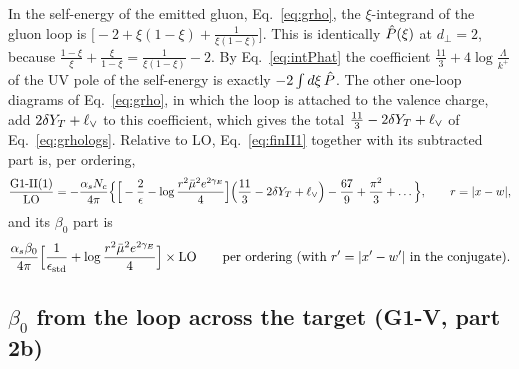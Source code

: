 In the self-energy of the emitted gluon, Eq.~\eqref{eq:grho}, the $\xi$-integrand of the gluon loop is $\big[-2+\xi(1-\xi)+\frac{1}{\xi(1-\xi)}\big]$. This is identically $\hat P(\xi)$ at $d_\perp=2$, because $\frac{1-\xi}{\xi}+\frac{\xi}{1-\xi}=\frac{1}{\xi(1-\xi)}-2$. By Eq.~\eqref{eq:intPhat} the coefficient $\frac{11}{3}+4\log\frac{\Lambda}{k^+}$ of the UV pole of the self-energy is exactly $-2\int d\xi\,\hat P$. The other one-loop diagrams of Eq.~\eqref{eq:grho}, in which the loop is attached to the valence charge, add $2\delta Y_T+\ell_{\vee}$ to this coefficient, which gives the total $\frac{11}{3}-2\delta Y_T+\ell_{\vee}$ of Eq.~\eqref{eq:grhologs}. Relative to LO, Eq.~\eqref{eq:finII1} together with its subtracted part is, per ordering,
\begin{equation}
\frac{\text{G1-II(1)}}{\rm LO}=-\frac{\alpha_sN_c}{4\pi}\Big\{\Big[-\frac2\epsilon-\log\frac{r^2\bar\mu^2e^{2\gamma_E}}{4}\Big]\Big(\frac{11}{3}-2\delta Y_T+\ell_{\vee}\Big)-\frac{67}{9}+\frac{\pi^2}{3}+\dots\Big\},\qquad r=|x-w|,
\end{equation}
and its $\beta_0$ part is
\begin{equation}
\frac{\alpha_s\beta_0}{4\pi}\Big[\frac{1}{\epsilon_{\rm std}}+\log\frac{r^2\bar\mu^2e^{2\gamma_E}}{4}\Big]\times{\rm LO}\qquad\text{per ordering (with $r'=|x'-w'|$ in the conjugate).}
\label{eq:b0II}
\end{equation}

\subsection{\texorpdfstring{$\beta_0$}{beta0} from the loop across the target (G1-V, part 2b)}\label{sec:b0V}

